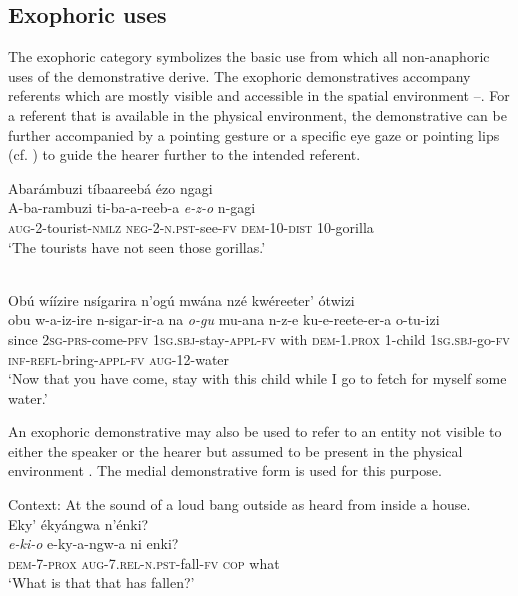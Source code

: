 \documentclass[output=paper 		  ]{langscibook}
\begin{document}
\subsection{Exophoric uses}\label{sec:asiimwe:4.1}

The exophoric category symbolizes the basic use from which all non-anaphoric uses of the demonstrative derive. The exophoric demonstratives accompany referents which are mostly visible and accessible in the spatial environment --. For a referent that is available in the physical environment, the demonstrative can be further accompanied by a pointing gesture or a specific eye gaze or pointing lips (cf. \citealt{Fillmore1997,Diessel1999,Diessel2012, Lyons1999, Levinson2004}) to guide the hearer further to the intended referent.

\ea%
    \label{ex:asiimwe:45}
    Abarámbuzi tíbaareebá ézo ngagi\\
  \gll A-ba-rambuzi  ti-ba-a-reeb-a  \emph{e-z-o}  n-gagi\\
  \textsc{aug}{}-2-tourist-\textsc{nmlz}  \textsc{neg}{}-2-\textsc{n.pst}{}-see-\textsc{fv}  \textsc{dem}{}-10-\textsc{dist}  10-gorilla\\
  \glt ‘The tourists have not seen those gorillas.'

\ex%
    \label{ex:asiimwe:46} \citet[201]{Asiimwe2014}\\
    Obú wíízire nsígarira n’ogú mwána nzé kwéreeter’ ótwizi\\
  \gll obu  w-a-iz-ire  n-sigar-ir-a  na  \emph{o-gu}    mu-ana n-z-e  ku-e-reete-er-a  o-tu-izi\\
  since  \textsc{2sg-prs}{}-come-\textsc{pfv}  \textsc{1sg.sbj-}stay-\textsc{appl-fv}  with  \textsc{dem}{}-1.\textsc{prox}  1-child 1\textsc{sg.sbj}{}-go-\textsc{fv}  \textsc{inf}-\textsc{refl}-bring-\textsc{appl-fv}  \textsc{aug}{}-12-water\\ 
  \glt ‘Now that you have come, stay with this child while I go to fetch for myself some water.’
\z


An exophoric demonstrative may also be used to refer to an entity not visible to either the speaker or the hearer but assumed to be present in the physical environment . The medial demonstrative form is used for this purpose.

\ea%
    \label{ex:asiimwe:47}
    Context: At the sound of a loud bang outside as heard from inside a house.\\
  Eky’ ékyángwa n’énki?\\
\gll  \emph{e-ki-o}  e-ky-a-ngw-a  ni  enki?\\
  \textsc{dem}{}-7-\textsc{prox}  \textsc{aug}{}-7.\textsc{rel-n.pst}{}-fall-\textsc{fv}  \textsc{cop}  what\\
\glt  ‘What is that that has fallen?’
\z
\end{document}

